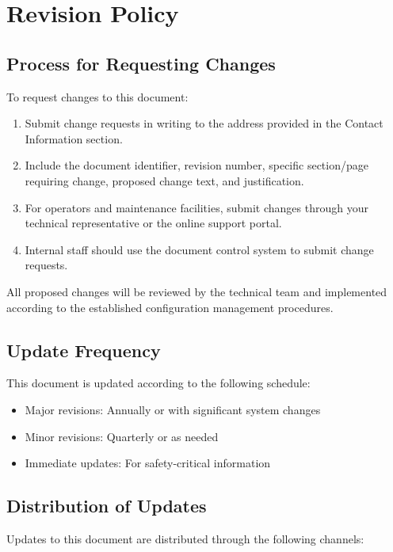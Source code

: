 \documentclass[12pt,a4paper,twoside,openright]{book}
\begin{document}
\section{Revision Policy}

\subsection{Process for Requesting Changes}

To request changes to this document:

\begin{enumerate}
    \item Submit change requests in writing to the address provided in the Contact Information section.
    \item Include the document identifier, revision number, specific section/page requiring change, proposed change text, and justification.
    \item For operators and maintenance facilities, submit changes through your technical representative or the online support portal.
    \item Internal staff should use the document control system to submit change requests.
\end{enumerate}

All proposed changes will be reviewed by the technical team and implemented according to the established configuration management procedures.

\subsection{Update Frequency}

This document is updated according to the following schedule:

\begin{itemize}
    \item Major revisions: Annually or with significant system changes
    \item Minor revisions: Quarterly or as needed
    \item Immediate updates: For safety-critical information
\end{itemize}

\subsection{Distribution of Updates}

Updates to this document are distributed through the following channels:
\end{document}

